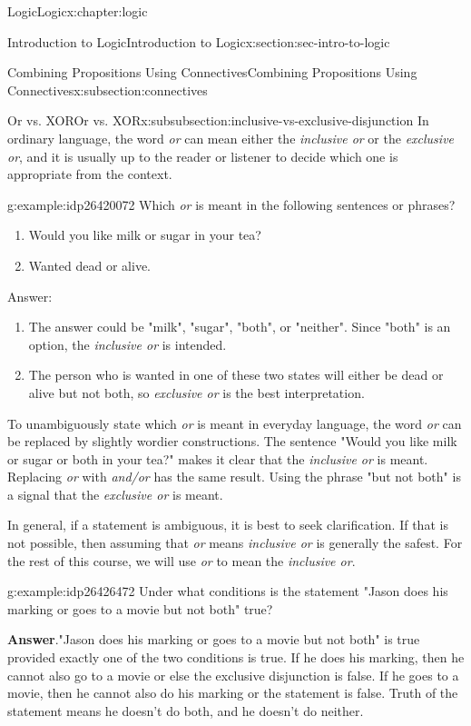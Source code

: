 \documentclass[twoside,10pt,]{book}
\newcommand{\blocktitlefont}{\relax}
\numberwithin{equation}{section}
\begin{document}
\begin{chapterptx}{Logic}{}{Logic}{}{}{x:chapter:logic}
\begin{sectionptx}{Introduction to Logic}{}{Introduction to Logic}{}{}{x:section:sec-intro-to-logic}
\begin{subsectionptx}{Combining Propositions Using Connectives}{}{Combining Propositions Using Connectives}{}{}{x:subsection:connectives}
%
\begin{subsubsectionptx}{Or vs. XOR}{}{Or vs. XOR}{}{}{x:subsubsection:inclusive-vs-exclusive-disjunction}
In ordinary language, the word \emph{or} can mean either the \emph{inclusive or} or the \emph{exclusive or},  and it is usually up to the reader or listener to decide which one is appropriate from the context.%
\begin{example}{}{g:example:idp26420072}%
Which \emph{or} is meant in the following sentences or phrases?%
\begin{enumerate}
\item{}Would you like milk or sugar in your tea?%
\item{}Wanted dead or alive.%
\end{enumerate}
%
\par
Answer:%
\begin{enumerate}
\item{}The answer could be "milk", "sugar", "both", or "neither".  Since "both" is an option, the \emph{inclusive or} is intended.%
\item{}The person who is wanted in one of these two states will either be dead or alive but not both, so \emph{exclusive or} is the best interpretation.%
\end{enumerate}
%
\end{example}
To unambiguously state which \emph{or} is meant in everyday language, the word \emph{or} can be replaced by slightly wordier constructions.  The sentence "Would you like milk or sugar or both in your tea?" makes it clear that the \emph{inclusive or} is meant.  Replacing \emph{or} with \emph{and\slash{}or} has the same result.  Using the phrase "but not both" is a signal that the \emph{exclusive or} is meant.%
\par
In general, if a statement is ambiguous, it is best to seek clarification.  If that is not possible, then assuming that \emph{or} means \emph{inclusive or} is generally the safest.  For the rest of this course, we will use \emph{or} to mean the \emph{inclusive or}.%
\begin{example}{}{g:example:idp26426472}%
Under what conditions is the statement "Jason does his marking or goes to a movie but not both" true?\par\smallskip%
\noindent\textbf{\blocktitlefont Answer}.\label{g:answer:idp26449112}{}\hypertarget{g:answer:idp26449112}{}\quad{}"Jason does his marking or goes to a movie but not both" is true provided exactly one of the two conditions is true.  If he does his marking, then he cannot also go to a movie or else the exclusive disjunction is false.  If he goes to a movie, then he cannot also do his marking or the statement is false.  Truth of the statement means he doesn't do both, and he doesn't do neither.\end{example}

\end{subsubsectionptx}
\end{subsectionptx}
\end{sectionptx}
\end{chapterptx}
\end{document}
